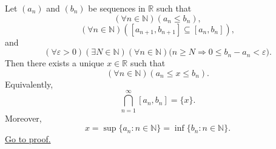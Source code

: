 \begin{corollary}
\label{cor:nested-intervals-vanishing-length-have-unique-point}
Let $(a_n)$ and $(b_n)$ be sequences in $\mathbb{R}$ such that
\[
  (\forall n\in\mathbb{N})(a_n\leq b_n),
\]
\[
  (\forall n\in\mathbb{N})([a_{n+1},b_{n+1}]\subseteq [a_n,b_n]),
\]
and
\[
  (\forall\varepsilon>0)(\exists N\in\mathbb{N})(\forall n\in\mathbb{N})
  \bigl(n\geq N\Longrightarrow 0\leq b_n-a_n<\varepsilon\bigr).
\]
Then there exists a unique $x\in\mathbb{R}$ such that
\[
  (\forall n\in\mathbb{N})(a_n\leq x\leq b_n).
\]
Equivalently,
\[
  \bigcap_{n=1}^{\infty}[a_n,b_n]=\{x\}.
\]
Moreover,
\[
  x=\sup\{a_n:n\in\mathbb{N}\}=\inf\{b_n:n\in\mathbb{N}\}.
\]
\hyperref[prf:nested-intervals-vanishing-length-have-unique-point]{Go to proof.}
\end{corollary}